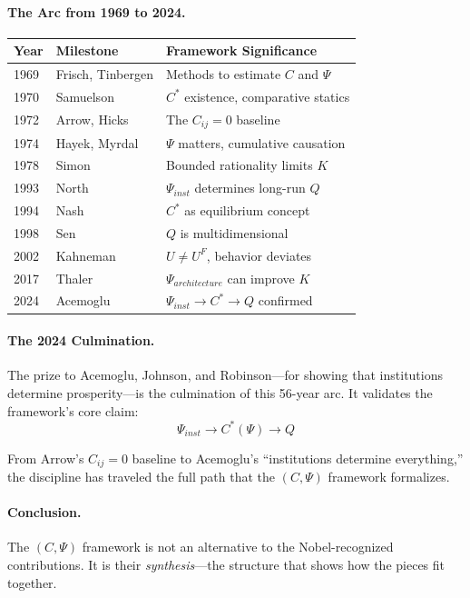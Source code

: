 \documentclass[12pt,a4paper]{article}
\begin{document}
\paragraph{The Arc from 1969 to 2024.}
\begin{center}
\renewcommand{\arraystretch}{1.2}
\begin{tabular}{lll}
\hline
\textbf{Year} & \textbf{Milestone} & \textbf{Framework Significance} \\
\hline
1969 & Frisch, Tinbergen & Methods to estimate $C$ and $\Psi$ \\
1970 & Samuelson & $C^*$ existence, comparative statics \\
1972 & Arrow, Hicks & The $C_{ij} = 0$ baseline \\
1974 & Hayek, Myrdal & $\Psi$ matters, cumulative causation \\
1978 & Simon & Bounded rationality limits $K$ \\
1993 & North & $\Psi_{inst}$ determines long-run $Q$ \\
1994 & Nash & $C^*$ as equilibrium concept \\
1998 & Sen & $Q$ is multidimensional \\
2002 & Kahneman & $U \neq U^F$, behavior deviates \\
2017 & Thaler & $\Psi_{architecture}$ can improve $K$ \\
2024 & Acemoglu & $\Psi_{inst} \to C^* \to Q$ confirmed \\
\hline
\end{tabular}
\end{center}

\paragraph{The 2024 Culmination.}
The prize to Acemoglu, Johnson, and Robinson---for showing that institutions
determine prosperity---is the culmination of this 56-year arc. It validates
the framework's core claim:
\begin{equation}
  \Psi_{inst} \to C^*(\Psi) \to Q
\end{equation}

From Arrow's $C_{ij} = 0$ baseline to Acemoglu's ``institutions determine everything,''
the discipline has traveled the full path that the $(C, \Psi)$ framework formalizes.

\paragraph{Conclusion.}
The $(C, \Psi)$ framework is not an alternative to the Nobel-recognized contributions.
It is their \emph{synthesis}---the structure that shows how the pieces fit together.
\end{document}
